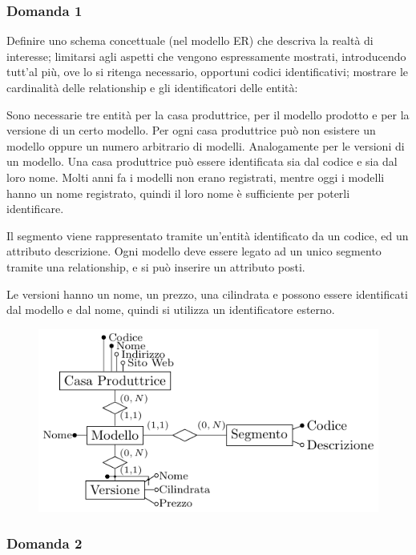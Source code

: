 \documentclass{article}
\numberwithin{equation}{subsection}
\begin{document}
\subsubsection*{Domanda 1}


Definire uno schema concettuale (nel modello ER) che descriva la realtà di interesse; limitarsi agli aspetti che vengono espressamente mostrati, introducendo tutt'al più, 
ove lo si ritenga necessario, opportuni codici identificativi; mostrare le cardinalità delle relationship e gli identificatori delle entità:


Sono necessarie tre entità per la casa produttrice, per il modello prodotto e per la versione di un certo modello. Per ogni casa produttrice può non esistere un 
modello oppure un numero arbitrario di modelli. Analogamente per le versioni di un modello. Una casa produttrice può essere identificata sia dal 
codice e sia dal loro nome. Molti anni fa i modelli non erano registrati, mentre oggi i modelli hanno un nome registrato, quindi il loro nome è sufficiente per 
poterli identificare. 

Il segmento viene rappresentato tramite un'entità identificato da un codice, ed un attributo descrizione. Ogni modello deve essere legato ad un unico segmento tramite 
una relationship, e si può inserire un attributo posti. 

Le versioni hanno un nome, un prezzo, una cilindrata e possono essere identificati dal modello e dal nome, quindi si utilizza un identificatore esterno. 

\begin{figure}[H]%
    \centering%
    \includegraphics[scale=1.3]{schema_er_es_2.pdf}%
\end{figure}

\subsubsection*{Domanda 2}
\end{document}
